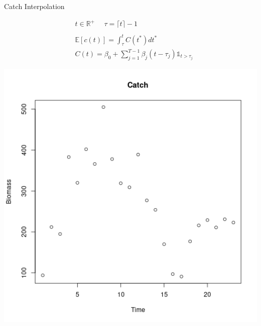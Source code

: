 \documentclass[ xcolor = pdftex, dvipsnames, table ]{beamer}
\begin{document}
%
\begin{frame}{Catch Interpolation}
\begin{minipage}[h!]{0.49\textwidth}
\begin{align*}
&t\in\mathbb{R}^+ ~~~ ~~~ \tau=\lceil t \rceil-1\\
~\\
&\mathds{E}[c(t)] = \int_\tau^{t} C(t^*) dt^* \\%
&C(t) = \beta_0 + \sum_{j=1}^{T-1} \beta_j (t-\tau_j) \mathds{1}_{t>\tau_j}
\end{align*}
\end{minipage}
\begin{minipage}[h!]{0.49\textwidth}
\includegraphics[width=1.1\textwidth]{../plots/hakeCatch.png}
\end{minipage}
\end{frame}
\end{document}
